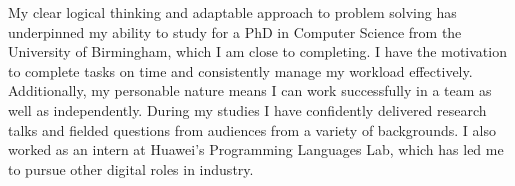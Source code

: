 
\vspace*{\fill}
\hspace{-2.5em}
\begin{minipage}{\sidewidth+0.5\margin}
\begin{center}

\vspace{2em}


\vspace{1em}

My clear logical thinking and adaptable approach to problem solving has
underpinned my ability to study for a PhD in Computer Science from the
University of Birmingham, which I am close to completing.
I have the motivation to complete tasks on time and consistently manage my
workload effectively.
Additionally, my personable nature means I can work
successfully in a team as well as independently.
During my studies I have confidently delivered research talks and fielded
questions from audiences from a variety of backgrounds.
I also worked as an intern at Huawei's Programming Languages Lab, which has led
me to pursue other digital roles in industry.

\vspace{2em}


\vspace{1em}



\end{center}
\end{minipage}
